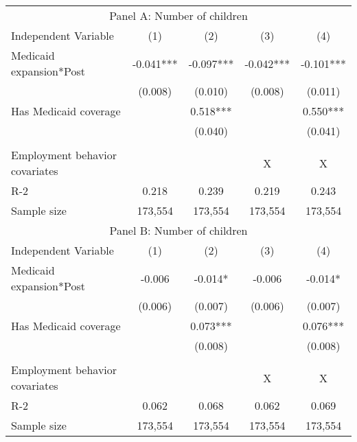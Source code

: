 \begin{tabular}{lcccc}
\toprule
\toprule
 \multicolumn{5}{c}{Panel A: Number of children } \\
 Independent Variable & (1) & (2) & (3) &  (4) \\
\midrule 
 Medicaid expansion*Post   & -0.041***   & -0.097***   & -0.042***   & -0.101***  \\
 & (0.008)   & (0.010)   & (0.008)   & (0.011)  \\
 Has Medicaid coverage   &   & 0.518***   &   & 0.550***  \\
 &    & (0.040)   &    & (0.041)  \\
\\
Employment behavior covariates  &  &  & X & X \\
R-2 & 0.218 & 0.239 & 0.219 & 0.243 \\
Sample size & 173,554 & 173,554 & 173,554 & 173,554 \\
\midrule
\midrule
 \multicolumn{5}{c}{Panel B: Number of children } \\
 Independent Variable & (1) & (2) & (3) &  (4) \\
\midrule 
 Medicaid expansion*Post   & -0.006   & -0.014*   & -0.006   & -0.014*  \\
 & (0.006)   & (0.007)   & (0.006)   & (0.007)  \\
 Has Medicaid coverage   &   & 0.073***   &   & 0.076***  \\
 &    & (0.008)   &    & (0.008)  \\
\\
Employment behavior covariates  &  &  & X & X \\
R-2 & 0.062 & 0.068 & 0.062 & 0.069 \\
Sample size & 173,554 & 173,554 & 173,554 & 173,554 \\
\midrule
\midrule
\bottomrule
\end{tabular}